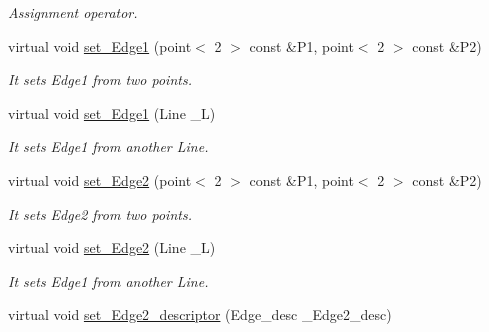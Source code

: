 \begin{DoxyCompactItemize}
\begin{DoxyCompactList}\small\item\em Assignment operator. \item\end{DoxyCompactList}\item 
\hypertarget{classintersector__base__class_a6c8fee82915c3745f41ffb5b714bda1c}{
virtual void \hyperlink{classintersector__base__class_a6c8fee82915c3745f41ffb5b714bda1c}{set\_\-Edge1} (point$<$ 2 $>$ const \&P1, point$<$ 2 $>$ const \&P2)}
\label{classintersector__base__class_a6c8fee82915c3745f41ffb5b714bda1c}

\begin{DoxyCompactList}\small\item\em It sets Edge1 from two points. \item\end{DoxyCompactList}\item 
\hypertarget{classintersector__base__class_a789a58d61926fc4f2b5fc096f355633b}{
virtual void \hyperlink{classintersector__base__class_a789a58d61926fc4f2b5fc096f355633b}{set\_\-Edge1} (Line \_\-L)}
\label{classintersector__base__class_a789a58d61926fc4f2b5fc096f355633b}

\begin{DoxyCompactList}\small\item\em It sets Edge1 from another Line. \item\end{DoxyCompactList}\item 
\hypertarget{classintersector__base__class_a60fe2748b57d0004d51e2ab0d8499401}{
virtual void \hyperlink{classintersector__base__class_a60fe2748b57d0004d51e2ab0d8499401}{set\_\-Edge2} (point$<$ 2 $>$ const \&P1, point$<$ 2 $>$ const \&P2)}
\label{classintersector__base__class_a60fe2748b57d0004d51e2ab0d8499401}

\begin{DoxyCompactList}\small\item\em It sets Edge2 from two points. \item\end{DoxyCompactList}\item 
\hypertarget{classintersector__base__class_a9388c8ba39f252ce90ba27958c212bdc}{
virtual void \hyperlink{classintersector__base__class_a9388c8ba39f252ce90ba27958c212bdc}{set\_\-Edge2} (Line \_\-L)}
\label{classintersector__base__class_a9388c8ba39f252ce90ba27958c212bdc}

\begin{DoxyCompactList}\small\item\em It sets Edge1 from another Line. \item\end{DoxyCompactList}\item 
\hypertarget{classintersector__base__class_ae7956127e010d767ade9529a977ac860}{
virtual void \hyperlink{classintersector__base__class_ae7956127e010d767ade9529a977ac860}{set\_\-Edge2\_\-descriptor} (Edge\_\-desc \_\-Edge2\_\-desc)}
\label{classintersector__base__class_ae7956127e010d767ade9529a977ac860}


\end{DoxyCompactItemize}

